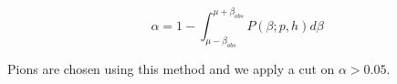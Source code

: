 \begin{equation}
  \alpha = 1 - \int_{\mu-\beta_{obs}}^{\mu+\beta_{obs}} P(\beta;p,h) d\beta
\end{equation}


Pions are chosen using this method and we apply a cut on $\alpha > 0.05$.  



